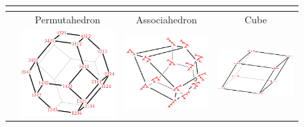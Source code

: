 \documentclass[a4paper,12pt]{article}
\begin{document}
\begin{figure}[h]
\begin{tabular}{l|c|c|c}
	& \cite{LascouxSchutzenberger} & \cite{TamariFestschrift} & \\
	\hline
	& Permutahedron & Associahedron & Cube \\
	\rotatebox{90}{\hspace*{.5cm} Geometry} & \includegraphics[scale=.4]{permutahedron} & \includegraphics[scale=.3]{associahedronLoday} & \includegraphics[scale=.35]{figures/parallelepiped.pdf} \\

\end{tabular}
\end{figure}
\end{document}
